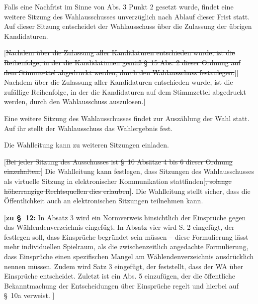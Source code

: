 \documentclass[%
draft,%
multilinesections%
]{fswo}
\newcommand\oldT[1]  {{\color{Gray}[\st{#1}]}}
\newcommand\newT[1]  {{\color{Green}[#1]}}
\newcommand\bemFr[1] {{\color{Red}[#1]}}
\newcommand\oldT[1]{}%
\newcommand\newT[1]{#1}
\newcommand\bemFr[1]{}%
\newcommand\change[2]{\oldT{#1}\newT{#2}}
\begin{document}
\begin{contract}
Falls eine Nachfrist im Sinne von Abs. 3 Punkt 2 gesetzt wurde, findet eine weitere Sitzung des Wahlausschusses unverzüglich nach Ablauf dieser Frist statt.
Auf dieser Sitzung entscheidet der Wahlausschuss über die Zulassung der übrigen Kandidaturen.

\change{Nachdem über die Zulassung aller Kandidaturen entschieden wurde, ist die Reihenfolge, in der die Kandidatinnen gemäß \S~15 Abs. 2 dieser Ordnung auf dem Stimmzettel abgedruckt werden, durch den Wahlausschuss festzulegen.}{%
Nachdem über die Zulassung aller Kandidaturen entschieden wurde, ist die zufällige Reihenfolge, in der die Kandidaturen auf dem Stimmzettel abgedruckt werden, durch den Wahlausschuss auszulosen.}

Eine weitere Sitzung des Wahlausschusses findet zur Auszählung der Wahl statt. Auf ihr stellt der Wahlausschuss das Wahlergebnis fest.

Die Wahlleitung kann zu weiteren Sitzungen einladen.

\oldT{Bei jeder Sitzung des Ausschusses ist \S~10 Absätze 4 bis 6 dieser Ordnung einzuhalten.}
Die Wahlleitung kann festlegen, dass Sitzungen des Wahlausschusses als virtuelle Sitzung in elektronischer Kommunikation stattfinden\oldT{, solange höherrangige Rechtsquellen dies erlauben}.
Die Wahlleitung stellt sicher, dass die Öffentlichkeit auch an elektronischen Sitzungen teilnehmen kann.
\end{contract}

\bemFr{\textbf{zu \S~12:}
In Absatz 3 wird ein Normverweis hinsichtlich der Einsprüche gegen das Wählendenverzeichnis eingefügt.
In Absatz vier wird S. 2 eingefügt, der festlegen soll, dass Einsprüche begründet sein müssen
– diese Formulierung lässt mehr individuellen Spielraum, als die zwischenzeitlich angedachte Formulierung,
dass Einsprüche einen spezifischen Mangel am Wählendenverzeichnis ausdrücklich nennen müssen.
Zudem wird Satz 3 eingefügt, der feststellt, dass der WA über Einsprüche entscheidet.
Zuletzt ist ein Abs. 5 einzufügen, der die öffentliche Bekanntmachung der Entscheidungen über Einsprüche regelt und hierbei auf \S~10a verweist.
}
\end{document}

